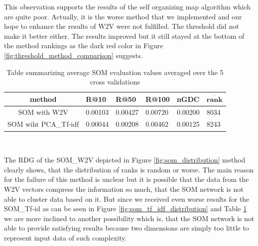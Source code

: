 This observation supports the results of the self organizing map algorithm which are quite poor. Actually, it is the worse method that we implemented and our hope to enhance the results of W2V were not fulfilled. The threshold did not make it better either. The results improved but it still stayed at the bottom of the method rankings as the dark red color in Figure \ref{fig:threshold_method_comparison} suggests.

\begin{table}[h]
\centering
\renewcommand{\arraystretch}{1.5}
\begin{tabu} to 1\textwidth { | c || X[c] | X[c] | X[c] | X[c] | X[c] |}
 \hline
 \textbf{method} & \textbf{R@10} & \textbf{R@50} & \textbf{R@100} & \textbf{nGDC} & $ \boldsymbol{\overline{rank}} $ \\
 \hline
 \hline
 SOM with W2V & 0.00103 & 0.00427 & 0.00720 & 0.00200 & 8034 \\
 \hline
 SOM wiht PCA\_Tf-idf & 0.00044 & 0.00208 & 0.00462 & 0.00125 & 8243 \\
 \hline
\end{tabu} \\
\caption{Table summarizing average SOM evaluation values averaged over the 5 cross validations}
\label{table:som}
\end{table}

The RDG of the SOM\_W2V depicted in Figure \ref{fig:som_distribution} method clearly shows, that the distribution of ranks is random or worse. The main reason for the failure of this method is unclear but it is possible that the data from the W2V vectors compress the information so much, that the SOM network is not able to cluster data based on it. But since we received even worse results for the SOM\_Tf-id as can be seen in Figure \ref{fig:som_tf_idf_distribution} and Table \ref{table:som} we are more inclined to another possibility which is, that the SOM network is not able to provide satisfying results because two dimensions are simply too little to represent input data of such complexity.

